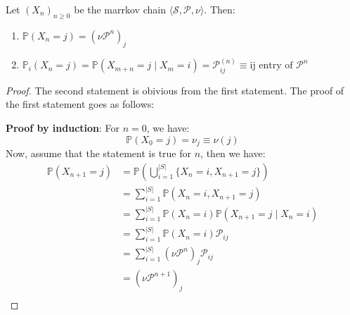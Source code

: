 \begin{theorem}
    Let \({(X_n)}_{n \geq 0}\) be the marrkov chain \(\langle \mathcal{S} , \mathcal{P} , \nu \rangle\).
    Then:
    \begin{enumerate}
        \item \(\mathbb{P} (X_n = j) = {(\nu \mathcal{P} ^{n})}_{j} \)
        \item \(\mathbb{P}_i (X_n = j) = \mathbb{P} \left( X_{m+n} = j \mid X_m = i \right) 
        = \mathcal{P}_{ij}^{(n)}\equiv \text{ij entry of } \mathcal{P} ^{n}\)
    \end{enumerate}
\end{theorem}
\begin{proof}
    The second statement is obivious from the first statement. The proof of the first statement goes as follows:

    \textbf{Proof by induction}: For \(n=0\), we have:
    \[
        \mathbb{P} (X_0 = j) = \nu _j \equiv \nu(j)  
    \]
    Now, assume that the statement is true for \(n\), then we have:
    \[
        \begin{aligned}
            \mathbb{P} (X_{n+1} = j) &= \mathbb{P} \left( 
                \bigcup_{i=1}^{ |S| } \{X_n = i , X_{n+1} = j\}
             \right) \\
                &= \sum_{i=1}^{ |S| } \mathbb{P} (X_n = i, X_{n+1} = j) \\
                &= \sum_{i=1}^{ |S| } \mathbb{P} (X_n = i) \mathbb{P} (X_{n+1} = j \mid X_n = i) \\
                &= \sum_{i=1}^{ |S| } \mathbb{P} (X_n = i) \mathcal{P}_{ij} \\
                &= \sum_{i=1}^{ |S| } {(\nu \mathcal{P}^n)}_j \mathcal{P}_{ij} \\
                &= {(\nu \mathcal{P}^{n+1})}_j \\
        \end{aligned}
    \]
\end{proof}
